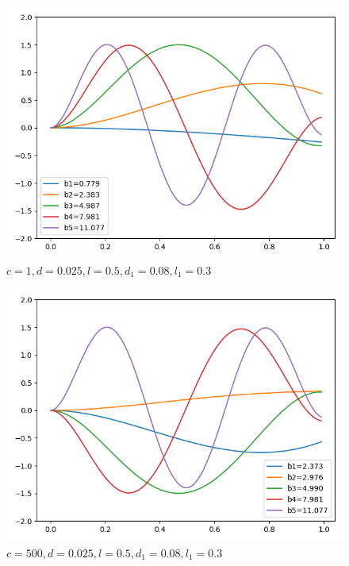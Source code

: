 \documentclass[12pt, a4paper]{extarticle}
\begin{document}
			\begin{figure}[h!]
             \centering
              \includegraphics[scale=0.6]{EigenFunc(c=1)}
              \caption{$c=1, d=0.025, l=0.5, d_1=0.08, l_1=0.3$}
			\end{figure}
			\newpage
			\begin{figure}[h!]
             \centering
              \includegraphics[scale=0.6]{EigenFunc(c=500)}
              \caption{$c=500, d=0.025, l=0.5, d_1=0.08, l_1=0.3$}
			\end{figure}
\end{document}
